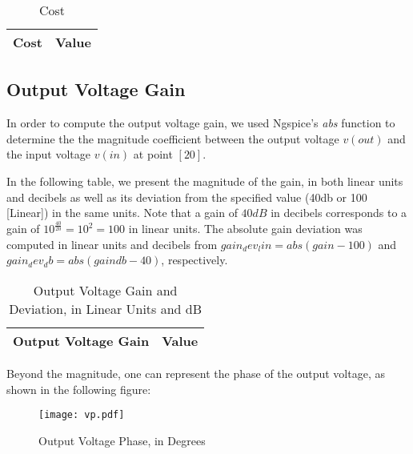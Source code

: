 \begin{table}[H]
  \centering
  \begin{tabular}{ |l|r| } 
    \hline    
    {\bf Cost} & {\bf Value} \\ \hline
    
  \end{tabular}
  \caption{Cost}
  \label{tab:cost}
\end{table}


\subsection{Output Voltage Gain}
\label{output_gain}
\par In order to compute the output voltage gain, we used Ngspice's \textit{abs} function to determine the the magnitude coefficient between the output voltage $v(out)$ and the input voltage $v(in)$ at point $[20]$.

 \par In the following table, we present the magnitude of the gain, in both linear units and decibels as well as its deviation from the specified value (40db or 100 [Linear]) in the same units.
 Note that a gain of $40dB$ in decibels corresponds to a gain of $10^{\frac{40}{20}}=10^2=100$ in linear units.
 The absolute gain deviation was computed in linear units and decibels from $gain_dev_lin= abs(gain-100)$ and $gain_dev_db = abs(gaindb-40)$, respectively. 
 
\begin{table}[H]
  \centering
  \begin{tabular}{|l|r|}
    \hline    
    {\bf Output Voltage Gain} & {\bf Value} \\ \hline
    
  \end{tabular}
  \caption{Output Voltage Gain and Deviation, in Linear Units and dB}
  \label{tab:gain}
\end{table}

\par Beyond the magnitude, one can represent the phase of the output voltage, as shown in the following figure:

\begin{figure}[H] \centering
\texttt{[image: vp.pdf]}
\caption{Output Voltage Phase, in Degrees}
\label{fig:vp}
\end{figure}



